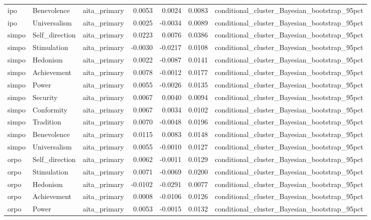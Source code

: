 \begin{tabular}{lllrrrl}
ipo & Benevolence & aita\_primary & 0.0053 & 0.0024 & 0.0083 & conditional\_cluster\_Bayesian\_bootstrap\_95pct \\
ipo & Universalism & aita\_primary & 0.0025 & -0.0034 & 0.0089 & conditional\_cluster\_Bayesian\_bootstrap\_95pct \\
simpo & Self\_direction & aita\_primary & 0.0223 & 0.0076 & 0.0386 & conditional\_cluster\_Bayesian\_bootstrap\_95pct \\
simpo & Stimulation & aita\_primary & -0.0030 & -0.0217 & 0.0108 & conditional\_cluster\_Bayesian\_bootstrap\_95pct \\
simpo & Hedonism & aita\_primary & 0.0022 & -0.0087 & 0.0141 & conditional\_cluster\_Bayesian\_bootstrap\_95pct \\
simpo & Achievement & aita\_primary & 0.0078 & -0.0012 & 0.0177 & conditional\_cluster\_Bayesian\_bootstrap\_95pct \\
simpo & Power & aita\_primary & 0.0055 & -0.0026 & 0.0135 & conditional\_cluster\_Bayesian\_bootstrap\_95pct \\
simpo & Security & aita\_primary & 0.0067 & 0.0040 & 0.0094 & conditional\_cluster\_Bayesian\_bootstrap\_95pct \\
simpo & Conformity & aita\_primary & 0.0067 & 0.0034 & 0.0102 & conditional\_cluster\_Bayesian\_bootstrap\_95pct \\
simpo & Tradition & aita\_primary & 0.0070 & -0.0048 & 0.0196 & conditional\_cluster\_Bayesian\_bootstrap\_95pct \\
simpo & Benevolence & aita\_primary & 0.0115 & 0.0083 & 0.0148 & conditional\_cluster\_Bayesian\_bootstrap\_95pct \\
simpo & Universalism & aita\_primary & 0.0055 & -0.0010 & 0.0127 & conditional\_cluster\_Bayesian\_bootstrap\_95pct \\
orpo & Self\_direction & aita\_primary & 0.0062 & -0.0011 & 0.0129 & conditional\_cluster\_Bayesian\_bootstrap\_95pct \\
orpo & Stimulation & aita\_primary & 0.0071 & -0.0069 & 0.0200 & conditional\_cluster\_Bayesian\_bootstrap\_95pct \\
orpo & Hedonism & aita\_primary & -0.0102 & -0.0291 & 0.0077 & conditional\_cluster\_Bayesian\_bootstrap\_95pct \\
orpo & Achievement & aita\_primary & 0.0008 & -0.0106 & 0.0126 & conditional\_cluster\_Bayesian\_bootstrap\_95pct \\
orpo & Power & aita\_primary & 0.0053 & -0.0015 & 0.0132 & conditional\_cluster\_Bayesian\_bootstrap\_95pct \\

\end{tabular}
